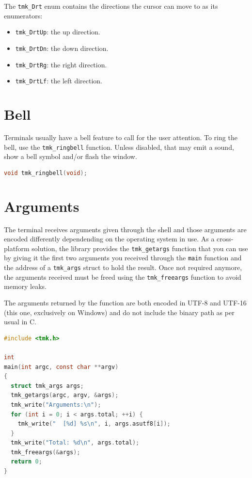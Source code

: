 \documentclass{report}
\begin{document}
The \texttt{tmk\_Drt} enum contains the directions the cursor can move to as its enumerators:
\begin{itemize}
  \item \texttt{tmk\_DrtUp}: the up direction.
  \item \texttt{tmk\_DrtDn}: the down direction.
  \item \texttt{tmk\_DrtRg}: the right direction.
  \item \texttt{tmk\_DrtLf}: the left direction.
\end{itemize}
\section{Bell}
Terminals usually have a bell feature to call for the user attention. To ring the bell, use the \texttt{tmk\_ringbell} function. Unless disabled, that may emit a sound, show a bell symbol and/or flash the window.
\begin{lstlisting}[language=c,caption=the declaration of the \texttt{tmk\_ringbell} function.]
void tmk_ringbell(void);
\end{lstlisting}
\section{Arguments}
The terminal receives arguments given through the shell and those arguments are encoded differently dependending on the operating system in use. As a cross-platform solution, the library provides the \texttt{tmk\_getargs} function that you can use by giving it the first two arguments you received through the \texttt{main} function and the address of a \texttt{tmk\_args} struct to hold the result. Once not required anymore, the arguments received must be freed using the \texttt{tmk\_freeargs} function to avoid memory leaks.

The arguments returned by the function are both encoded in UTF-8 and UTF-16 (this one, exclusively on Windows) and do not include the binary path as per usual in C.
\begin{lstlisting}[language=c,caption=an example that gets the command line arguments.]
#include <tmk.h>

int
main(int argc, const char **argv)
{
  struct tmk_args args;
  tmk_getargs(argc, argv, &args);
  tmk_write("Arguments:\n");
  for (int i = 0; i < args.total; ++i) {
    tmk_write("  [%d] %s\n", i, args.asutf8[i]);
  }
  tmk_write("Total: %d\n", args.total);
  tmk_freeargs(&args);
  return 0;
}
\end{lstlisting}
\end{document}
